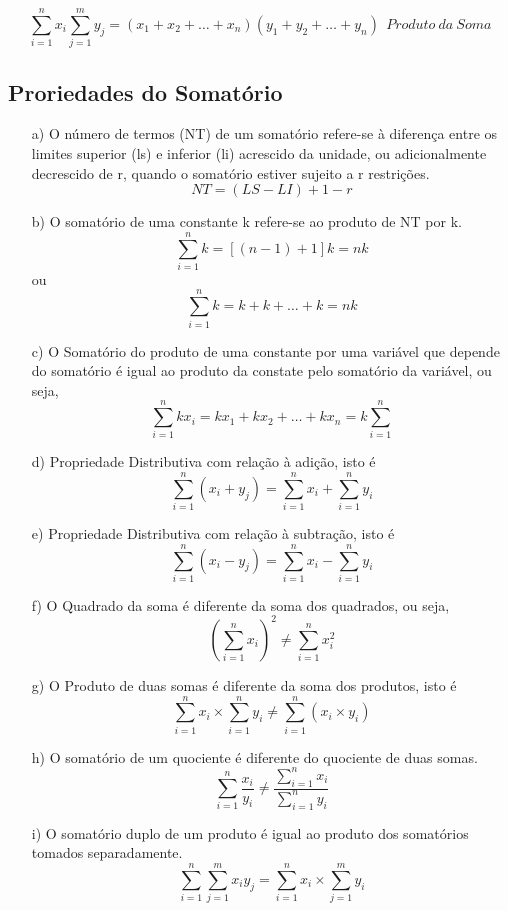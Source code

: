 $$ \sum_{i=1}^{n}x_{i} \sum_{j=1}^{m}y_{j}= (x_{1}+x_{2}+\ldots+x_{n})(y_{1}+y_{2}+\ldots+y_{n}) \ \ Produto \ da \ Soma$$


\subsection{Proriedades do Somatório}

\begin{enumerate}
  \item [{a})] O número de termos (NT) de um somatório refere-se à diferença entre os limites superior (ls) e inferior (li) acrescido da unidade, ou adicionalmente decrescido de r, quando o somatório estiver sujeito a r restrições.
\begin{equation}\label{}
    NT=(LS-LI)+1-r
\end{equation}
  \item [{b})] O somatório de uma constante k refere-se ao produto de NT por k.
$$\sum_{i=1}^{n}k=[(n-1)+1]k=nk$$
ou
$$ \sum_{i=1}^{n}k=k+k+\ldots+k=nk $$
  \item [{c})] O Somatório do produto de uma constante por uma variável que depende do somatório é igual ao produto da constate pelo somatório da variável, ou seja,
$$ \sum_{i=1}^{n}kx_{i}=kx_{1}+kx_{2}+\ldots+kx_{n}=k\sum_{i=1}^{n} $$
      \item [{d})] Propriedade Distributiva com relação à adição, isto é
$$ \sum_{i=1}^{n}(x_{i}+y_{j})= \sum_{i=1}^{n}x_{i}+ \sum_{i=1}^{n}y_{i} $$
  \item [{e})] Propriedade Distributiva com relação à subtração, isto é
$$ \sum_{i=1}^{n}(x_{i}-y_{j})= \sum_{i=1}^{n}x_{i}- \sum_{i=1}^{n}y_{i} $$
  \item [{f})] O Quadrado da soma é diferente da soma dos quadrados, ou seja,
  $$\left(\sum_{i=1}^{n}x_{i}\right)^{2}\neq \sum_{i=1}^{n}x_{i}^{2}$$
  \item [{g})] O Produto de duas somas é diferente da soma dos produtos, isto é
  $$ \sum_{i=1}^{n}x_{i} \times \sum_{i=1}^{n}y_{i} \neq \sum_{i=1}^{n} (x_{i} \times y_{i}) $$
  \item [{h})] O somatório de um quociente é diferente do quociente de duas somas.
$$ \sum_{i=1}^{n} \frac{x_{i}}{y_{i}} \neq \frac{\sum_{i=1}^{n}x_{i}}{\sum_{i=1}^{n}y_{i}}$$
  \item [{i})] O somatório duplo de um produto é igual ao produto dos somatórios tomados separadamente.
  $$  \sum_{i=1}^{n} \sum_{j=1}^{m}x_{i}y_{j}=  \sum_{i=1}^{n}x_{i} \times \sum_{j=1}^{m}y_{i}$$
\end{enumerate}


